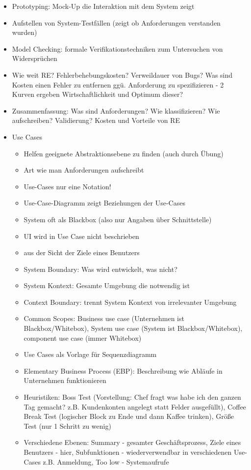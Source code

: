\documentclass[paper=a4, fontsize=11pt]{scrartcl} %
\numberwithin{equation}{section} %
\numberwithin{figure}{section} %
\numberwithin{table}{section} %
\begin{document}
\begin{itemize}
  \item Prototyping: Mock-Up die Interaktion mit dem System zeigt
  \item Aufstellen von System-Testfällen (zeigt ob Anforderungen verstanden wurden)
  \item Model Checking: formale Verifikationstechniken zum Untersuchen von Widersprüchen
  \item Wie weit RE? Fehlerbehebungskosten? Verweildauer von Bugs? Was sind Kosten einen Fehler zu entfernen ggü. Anforderung zu spezifizieren - 2 Kurven ergeben Wirtschaftlichkeit und Optimum dieser?
  \item Zusammenfassung: Was sind Anforderungen? Wie klassifizieren? Wie aufschreiben? Validierung? Kosten und Vorteile von RE
  \item{Use Cases}
  \begin{itemize}
    \item Helfen geeignete Abstraktionsebene zu finden (auch durch Übung)
    \item Art wie man Anforderungen aufschreibt
    \item Use-Cases nur eine Notation!
    \item Use-Case-Diagramm zeigt Beziehungen der Use-Cases
    \item System oft als Blackbox (also nur Angaben über Schnittstelle)
    \item UI wird in Use Case nicht beschrieben
    \item aus der Sicht der Ziele eines Benutzers
    \item System Boundary: Was wird entwickelt, was nicht?
    \item System Kontext: Gesamte Umgebung die notwendig ist
    \item Context Boundary: trennt System Kontext von irrelevanter Umgebung
    \item Common Scopes: Business use case (Unternehmen ist Blackbox/Whitebox), System use case (System ist Blackbox/Whitebox), component use case (immer Whitebox)
    \item Use Cases als Vorlage für Sequenzdiagramm
    \item Elementary Business Process (EBP): Beschreibung wie Abläufe in Unternehmen funktionieren
    \item Heuristiken: Boss Test (Vorstellung: Chef fragt was habe ich den ganzen Tag gemacht? z.B. Kundenkonten angelegt statt Felder ausgefüllt), Coffee Break Test (logischer Block zu Ende und dann Kaffee trinken), Größe Test (nur 1 Schritt zu wenig)
    \item Verschiedene Ebenen: Summary - gesamter Geschäftsprozess, Ziele eines Benutzers - hier, Subfunktionen - wiederverwendbar in verschiedenen Use-Cases z.B. Anmeldung, Too low - Systemaufrufe

\end{itemize}
\end{itemize}
\end{document}
